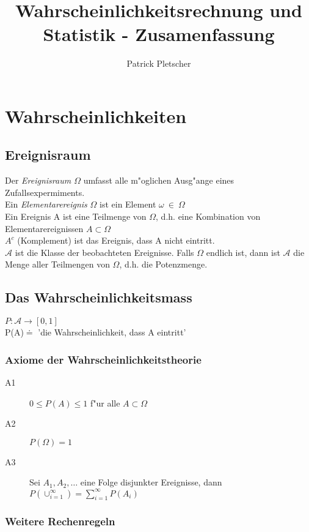 \documentclass[10pt, a4paper, twocolumn]{scrartcl}
\title{Wahrscheinlichkeitsrechnung und Statistik - Zusamenfassung}
\author{Patrick Pletscher}
\begin{document}
\maketitle

\section{Wahrscheinlichkeiten}

\subsection{Ereignisraum}

Der \textit{Ereignisraum $\Omega$} umfasst alle m"oglichen Ausg"ange eines Zufallsexpermiments.\\
Ein \textit{Elementarereignis} $\Omega$ ist ein Element $\omega\:\in\:\Omega$\\
Ein Ereignis A ist eine Teilmenge von $\Omega$, d.h. eine Kombination von Elementarereignissen $A \subset \Omega$\\

$A^c$ (Komplement) ist das Ereignis, dass A nicht eintritt.\\

$\mathcal{A}$ ist die Klasse der beobachteten Ereignisse. Falls $\Omega$ endlich ist, dann ist $\mathcal{A}$ die Menge aller Teilmengen  von $\Omega$, d.h. die Potenzmenge.

\subsection{Das Wahrscheinlichkeitsmass}

$P:\mathcal{A}\rightarrow[0,1]$\\
P(A)$\doteq$ 'die Wahrscheinlichkeit, dass A eintritt'

\subsubsection{Axiome der Wahrscheinlichkeitstheorie}
\begin{description}
 \item [A1] $0\leq P(A) \leq 1$ f"ur alle $A \subset \Omega$
 \item [A2] $P(\Omega )=1$
 \item [A3] Sei $A_1,A_2,\ldots$ eine Folge disjunkter Ereignisse, dann $P(\cup^\infty_{i=1})=\sum^\infty_{i=1}P(A_i)$
\end{description}

\subsubsection{Weitere Rechenregeln}
\end{document}
